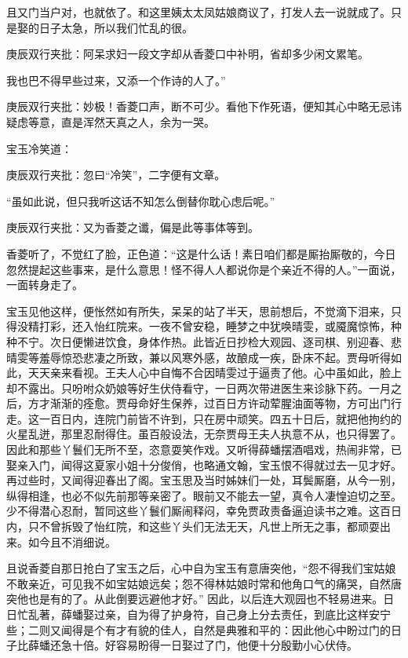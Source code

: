 \begin{parag}
且又门当户对，也就依了。和这里姨太太凤姑娘商议了，打发人去一说就成了。只是娶的日子太急，所以我们忙乱的很。\begin{note}庚辰双行夹批：阿呆求妇一段文字却从香菱口中补明，省却多少闲文累笔。\end{note}我也巴不得早些过来，又添一个作诗的人了。”\begin{note}庚辰双行夹批：妙极！香菱口声，断不可少。看他下作死语，便知其心中略无忌讳疑虑等意，直是浑然天真之人，余为一哭。\end{note}宝玉冷笑道：\begin{note}庚辰双行夹批：忽曰“冷笑”，二字便有文章。\end{note}“虽如此说，但只我听这话不知怎么倒替你耽心虑后呢。”\begin{note}庚辰双行夹批：又为香菱之谶，偏是此等事体等到。\end{note}香菱听了，不觉红了脸，正色道：“这是什么话！素日咱们都是厮抬厮敬的，今日忽然提起这些事来，是什么意思！怪不得人人都说你是个亲近不得的人。”一面说，一面转身走了。
\end{parag}


\begin{parag}
    宝玉见他这样，便怅然如有所失，呆呆的站了半天，思前想后，不觉滴下泪来，只得没精打彩，还入怡红院来。一夜不曾安稳，睡梦之中犹唤晴雯，或魇魔惊怖，种种不宁。次日便懒进饮食，身体作热。此皆近日抄检大观园、逐司棋、别迎春、悲晴雯等羞辱惊恐悲凄之所致，兼以风寒外感，故酿成一疾，卧床不起。贾母听得如此，天天亲来看视。王夫人心中自悔不合因晴雯过于逼责了他。心中虽如此，脸上却不露出。只吩咐众奶娘等好生伏侍看守，一日两次带进医生来诊脉下药。一月之后，方才渐渐的痊愈。贾母命好生保养，过百日方许动荤腥油面等物，方可出门行走。这一百日内，连院门前皆不许到，只在房中顽笑。四五十日后，就把他拘约的火星乱迸，那里忍耐得住。虽百般设法，无奈贾母王夫人执意不从，也只得罢了。因此和那些丫鬟们无所不至，恣意耍笑作戏。又听得薛蟠摆酒唱戏，热闹非常，已娶亲入门，闻得这夏家小姐十分俊俏，也略通文翰，宝玉恨不得就过去一见才好。再过些时，又闻得迎春出了阁。宝玉思及当时姊妹们一处，耳鬓厮磨，从今一别，纵得相逢，也必不似先前那等亲密了。眼前又不能去一望，真令人凄惶迫切之至。少不得潜心忍耐，暂同这些丫鬟们厮闹释闷，幸免贾政责备逼迫读书之难。这百日内，只不曾拆毁了怡红院，和这些丫头们无法无天，凡世上所无之事，都顽耍出来。如今且不消细说。
\end{parag}


\begin{parag}
    且说香菱自那日抢白了宝玉之后，心中自为宝玉有意唐突他，“怨不得我们宝姑娘不敢亲近，可见我不如宝姑娘远矣；怨不得林姑娘时常和他角口气的痛哭，自然唐突他也是有的了。从此倒要远避他才好。” 因此，以后连大观园也不轻易进来。日日忙乱著，薛蟠娶过亲，自为得了护身符，自己身上分去责任，到底比这样安宁些；二则又闻得是个有才有貌的佳人，自然是典雅和平的：因此他心中盼过门的日子比薛蟠还急十倍。好容易盼得一日娶过了门，他便十分殷勤小心伏侍。
\end{parag}


